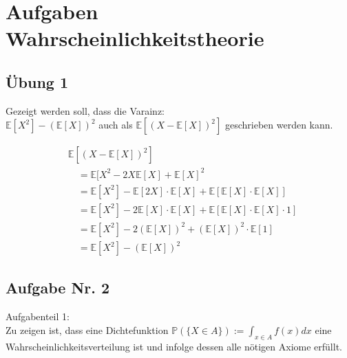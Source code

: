 \documentclass{newlayout}
\begin{document}
\section{Aufgaben Wahrscheinlichkeitstheorie}
\subsection{Übung 1}
Gezeigt werden soll, dass die Varainz:\\
 $\mathbb{E} [X^2] - (\mathbb{E} [X])^2$ auch als $\mathbb{E} [(X- \mathbb{E} [X] )^2 ]$ geschrieben werden kann.	

\begin{align*}
&\mathbb{E} [(X- \mathbb{E} [X] )^2 ] \\
&\quad= \mathbb{E} [X^2 - 2X \mathbb{E} [X] + \mathbb{E} [X]^2 \\
&\quad= \mathbb{E} [X^2] - \mathbb{E} [2X]  \cdot \mathbb{E} [X] + \mathbb{E} [\mathbb{E} [X] \cdot \mathbb{E} [X]]\\
&\quad= \mathbb{E} [X^2] - 2\mathbb{E} [X] \cdot \mathbb{E} [X] +  \mathbb{E} [\mathbb{E} [X] \cdot \mathbb{E} [X] \cdot 1]\\
&\quad= \mathbb{E} [X^2] - 2(\mathbb{E} [X])^2 + (\mathbb{E} [X])^2 \cdot \mathbb{E} [1]\\
&\quad= \mathbb{E} [X^2] - (\mathbb{E} [X])^2
\end{align*}


\subsection{Aufgabe Nr. 2}
Aufgabenteil 1:\\
Zu zeigen ist, dass eine Dichtefunktion $\mathbb{P}(\{X\in A\}):=\int_{x\in A}f(x)dx$ eine Wahrscheinlichkeitsverteilung ist und infolge dessen alle nötigen Axiome erfüllt.\\
\end{document}
